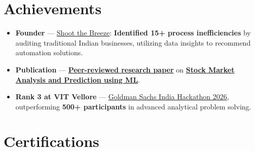 \documentclass[a4paper,11pt]{article}
\newcommand{\ulink}[2]{\href{#1}{#2}}
\begin{document}
\section{Achievements}
\vspace{2pt}

\begin{itemize}[nosep, leftmargin=1.5em, itemsep=2pt, topsep=2pt]
  \item {\color[HTML]{0A0A0A}\fontsize{11}{14}\selectfont \textbf{Founder} --- \ulink{https://shoot-the-breeze.vercel.app}{Shoot the Breeze}: \textbf{Identified 15+ process inefficiencies} by auditing traditional Indian businesses, utilizing data insights to recommend automation solutions.}
  \item {\color[HTML]{0A0A0A}\fontsize{11}{14}\selectfont \textbf{Publication} --- \ulink{https://www.elruha.org/_files/ugd/614b1f_6b95e1b697bf452b9907ba46e0151c05.pdf\#page=774}{\textbf{Peer-reviewed research paper}} on \ulink{https://github.com/su-jin1425/Set-Project}{\textbf{Stock Market Analysis and Prediction using ML}}.}
  \item {\color[HTML]{0A0A0A}\fontsize{11}{14}\selectfont \textbf{Rank 3 at VIT Vellore} --- \ulink{https://www.hackerrank.com/contests/goldman-sachs-india-hackathon-2026-cs/leaderboard}{Goldman Sachs India Hackathon 2026}, outperforming \textbf{500+ participants} in advanced analytical problem solving.}
\end{itemize}

\section{Certifications}
\vspace{2pt}
\end{document}
